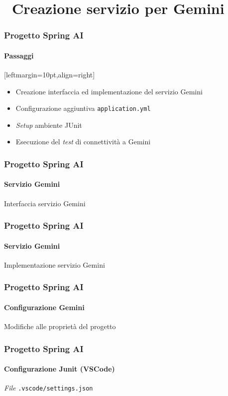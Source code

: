 \section{\faWrench\ Creazione servizio per Gemini} %
\label{sec:spring-ai-gemini-service}
%
\begin{frame}[t,fragile] \frametitle{Progetto Spring AI}
    \framesubtitle{Passaggi}[leftmargin=10pt,align=right]
	\begin{itemize}
        \item[\alertedcircled{1}] Creazione interfaccia ed implementazione del servizio Gemini
        \item[\alertedcircled{2}] Configurazione aggiuntiva \texttt{application.yml}
        \item[\alertedcircled{3}] \textit{Setup} ambiente JUnit
        \item[\alertedcircled{4}] Esecuzione del \textit{test} di connettività a Gemini 
	\end{itemize}        
\end{frame}
%
\begin{frame}[t,fragile] \frametitle{Progetto Spring AI}
    \framesubtitle{Servizio Gemini}
        \begin{block}{Interfaccia servizio Gemini}
{\tiny}
    \end{block}
\end{frame}
%
\begin{frame}[t,fragile] \frametitle{Progetto Spring AI}
    \framesubtitle{Servizio Gemini}
        \begin{block}{Implementazione servizio Gemini}
{\tiny}
    \end{block}
\end{frame}
%
\begin{frame}[t,fragile] \frametitle{Progetto Spring AI}
    \framesubtitle{Configurazione Gemini}
        \begin{block}{Modifiche alle proprietà del progetto}
{\tiny}
    \end{block}
\end{frame}
%
\begin{frame}[t,fragile] \frametitle{Progetto Spring AI}
    \framesubtitle{Configurazione Junit (VSCode)}
        \begin{block}{\textit{File} \texttt{.vscode/settings.json}}
{\tiny}
    \end{block}
\end{frame}
